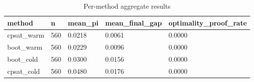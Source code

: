 \begin{table}[t]
\centering
\begin{tabular}{lllll}
\toprule
method & n & mean\_pi & mean\_final\_gap & optimality\_proof\_rate \\
\midrule
cpsat\_warm & 560 & 0.0218 & 0.0061 & 0.0000 \\
boot\_warm & 560 & 0.0229 & 0.0096 & 0.0000 \\
boot\_cold & 560 & 0.0300 & 0.0156 & 0.0000 \\
cpsat\_cold & 560 & 0.0480 & 0.0176 & 0.0000 \\
\bottomrule
\end{tabular}
\caption{Per-method aggregate results}
\label{tab:main-jssp}
\end{table}
